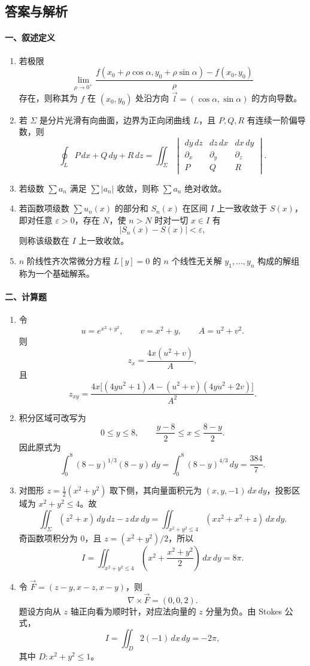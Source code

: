 \subsection{答案与解析}

\paragraph{一、叙述定义}
\begin{enumerate}
  \item 若极限
  \[
    \lim_{\rho\to0^+}\frac{f(x_0+\rho\cos\alpha,y_0+\rho\sin\alpha)-f(x_0,y_0)}{\rho}
  \]
  存在，则称其为 $f$ 在 $(x_0,y_0)$ 处沿方向 $\vec l=(\cos\alpha,\sin\alpha)$ 的方向导数。
  \item 若 $\Sigma$ 是分片光滑有向曲面，边界为正向闭曲线 $L$，且 $P,Q,R$ 有连续一阶偏导数，则
  \[
    \oint_L P\,dx+Q\,dy+R\,dz
    =
    \iint_\Sigma
    \begin{vmatrix}
      dy\,dz & dz\,dx & dx\,dy\\
      \partial_x & \partial_y & \partial_z\\
      P & Q & R
    \end{vmatrix}.
  \]
  \item 若级数 $\sum a_n$ 满足 $\sum |a_n|$ 收敛，则称 $\sum a_n$ 绝对收敛。
  \item 若函数项级数 $\sum u_n(x)$ 的部分和 $S_n(x)$ 在区间 $I$ 上一致收敛于 $S(x)$，即对任意 $\varepsilon>0$，存在 $N$，使 $n>N$ 时对一切 $x\in I$ 有
  \[
    |S_n(x)-S(x)|<\varepsilon,
  \]
  则称该级数在 $I$ 上一致收敛。
  \item $n$ 阶线性齐次常微分方程 $L[y]=0$ 的 $n$ 个线性无关解 $y_1,\ldots,y_n$ 构成的解组称为一个基础解系。
\end{enumerate}

\paragraph{二、计算题}
\begin{enumerate}
  \item 令
  \[
    u=e^{x^2+y^2},\qquad v=x^2+y,\qquad A=u^2+v^2.
  \]
  则
  \[
    z_x=\frac{4x(u^2+v)}{A},
  \]
  且
  \[
    z_{xy}=
    \frac{4x\bigl[(4yu^2+1)A-(u^2+v)(4yu^2+2v)\bigr]}{A^2}.
  \]
  \item 积分区域可改写为
  \[
    0\le y\le8,\qquad \frac{y-8}{2}\le x\le\frac{8-y}{2}.
  \]
  因此原式为
  \[
    \int_0^8(8-y)^{1/3}(8-y)\,dy
    =\int_0^8(8-y)^{4/3}\,dy
    =\frac{384}{7}.
  \]
  \item 对图形 $z=\frac12(x^2+y^2)$ 取下侧，其向量面积元为 $(x,y,-1)\,dx\,dy$，投影区域为 $x^2+y^2\le4$。故
  \[
    \iint_\Sigma (z^2+x)\,dy\,dz-z\,dx\,dy
    =
    \iint_{x^2+y^2\le4}(xz^2+x^2+z)\,dx\,dy.
  \]
  奇函数项积分为 $0$，且 $z=(x^2+y^2)/2$，所以
  \[
    I=\iint_{x^2+y^2\le4}\left(x^2+\frac{x^2+y^2}{2}\right)\,dx\,dy=8\pi.
  \]
  \item 令 $\vec F=(z-y,x-z,x-y)$，则
  \[
    \nabla\times\vec F=(0,0,2).
  \]
  题设方向从 $z$ 轴正向看为顺时针，对应法向量的 $z$ 分量为负。由 Stokes 公式，
  \[
    I=\iint_D 2(-1)\,dx\,dy=-2\pi,
  \]
  其中 $D:x^2+y^2\le1$。
\end{enumerate}

